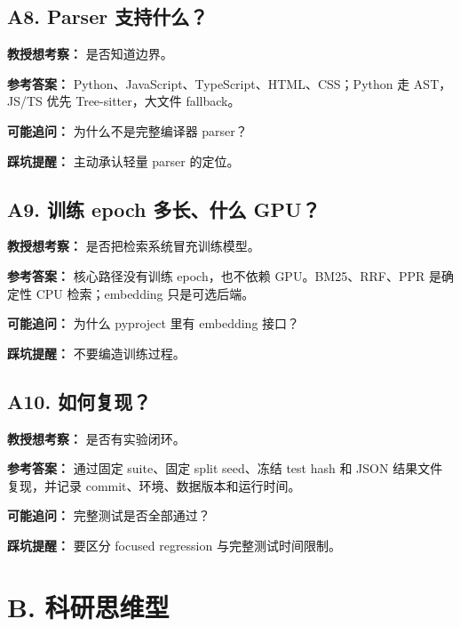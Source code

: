 \documentclass[UTF8,12pt,openany]{ctexbook}
\begin{document}
\subsection{A8. Parser 支持什么？}

\textbf{教授想考察：} 是否知道边界。\par

\textbf{参考答案：} Python、JavaScript、TypeScript、HTML、CSS；Python 走 AST，JS/TS 优先 Tree-sitter，大文件 fallback。\par

\textbf{可能追问：} 为什么不是完整编译器 parser？\par

\textbf{踩坑提醒：} 主动承认轻量 parser 的定位。\par

\subsection{A9. 训练 epoch 多长、什么 GPU？}

\textbf{教授想考察：} 是否把检索系统冒充训练模型。\par

\textbf{参考答案：} 核心路径没有训练 epoch，也不依赖 GPU。BM25、RRF、PPR 是确定性 CPU 检索；embedding 只是可选后端。\par

\textbf{可能追问：} 为什么 pyproject 里有 embedding 接口？\par

\textbf{踩坑提醒：} 不要编造训练过程。\par

\subsection{A10. 如何复现？}

\textbf{教授想考察：} 是否有实验闭环。\par

\textbf{参考答案：} 通过固定 suite、固定 split seed、冻结 test hash 和 JSON 结果文件复现，并记录 commit、环境、数据版本和运行时间。\par

\textbf{可能追问：} 完整测试是否全部通过？\par

\textbf{踩坑提醒：} 要区分 focused regression 与完整测试时间限制。\par

\section{B. 科研思维型}
\end{document}
